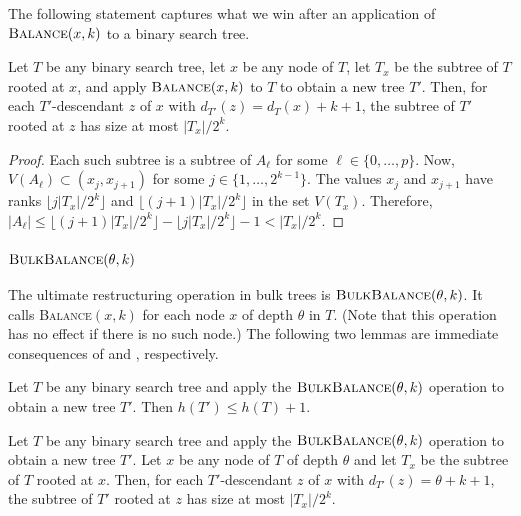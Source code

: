 \documentclass[kpfonts]{patmorin}
\let\le\leqslant
\begin{document}
The following statement captures what we win after an application of $\textsc{Balance}(x,k)$ to a binary search tree.

\begin{lem}
  Let $T$ be any binary search tree, let $x$ be any node of $T$, let $T_x$ be the subtree of $T$ rooted at $x$, and apply $\textsc{Balance}(x,k)$ to $T$ to obtain a new tree $T'$.  Then, for each $T'$-descendant $z$ of $x$ with $d_{T'}(z)=d_{T}(x)+k+1$, the subtree of $T'$ rooted at $z$ has size at most $|T_x|/2^k$.
\end{lem}

\begin{proof}
  Each such subtree is a subtree of $A_\ell$ for some $\ell\in\{0,\ldots,p\}$. Now, $V(A_\ell)\subset (x_j,x_{j+1})$ for some $j\in\{1,\ldots,2^{k-1}\}$.  The values $x_j$ and $x_{j+1}$ have ranks $\lfloor j|T_x|/2^k\rfloor$ and $\lfloor (j+1)|T_x|/2^k\rfloor$ in the set $V(T_x)$.  Therefore, $|A_\ell|\le \lfloor (j+1)|T_x|/2^k\rfloor- \lfloor j|T_x|/2^k\rfloor -1 < |T_x|/2^k$.
\end{proof}

\subsubsection{$\textsc{BulkBalance}(\theta,k)$}

The ultimate restructuring operation in bulk trees is $\textsc{BulkBalance}(\theta,k)$.
It calls \textsc{Balance}$(x,k)$ for each node $x$ of depth $\theta$ in $T$.
(Note that this operation has no effect if there is no such node.)
The following two lemmas are immediate consequences of  and , respectively.

\begin{lem}
  Let $T$ be any binary search tree and apply the $\textsc{BulkBalance}(\theta,k)$ operation to obtain a new tree $T'$.  Then $h(T')\le h(T)+1$.
\end{lem}

\begin{lem}
  Let $T$ be any binary search tree and apply the $\textsc{BulkBalance}(\theta,k)$ operation to obtain a new tree $T'$.
  Let $x$ be any node of $T$ of depth $\theta$ and let $T_x$ be the subtree of $T$ rooted at $x$.
  Then, for each $T'$-descendant $z$ of $x$ with $d_{T'}(z)=\theta+k+1$, the subtree of $T'$ rooted at $z$ has size at most $|T_x|/2^k$.
\end{lem}
\end{document}

